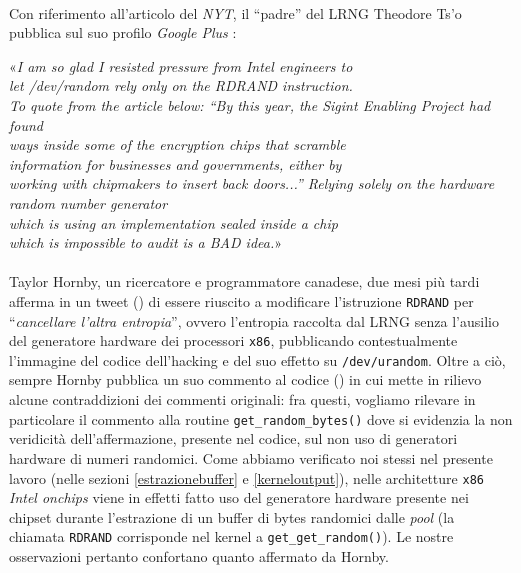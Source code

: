 \documentclass{article}
\begin{document}
 \paragraph{}Con riferimento all'articolo del \emph{NYT}, il ``padre'' del LRNG
 Theodore Ts'o pubblica sul suo profilo \emph{Google Plus} \cite{tso2}:
 \begin{center}
 «\emph{I am so glad I resisted pressure from Intel engineers to \\ 
 let /dev/random rely only on the RDRAND instruction.\\   
 To quote from the article below:\newline\newline
``By this year, the Sigint Enabling Project had found\\ 
ways inside some of the encryption chips that scramble\\
information for businesses and governments, either by \\
working with chipmakers to insert back doors...''\newline\newline
Relying solely on the hardware random number generator \\
which is using an implementation sealed inside a chip\\ 
which is impossible to audit is a BAD idea.﻿}»
 \end{center}
 \paragraph{}Taylor Hornby, un ricercatore e programmatore canadese, due mesi
 più tardi afferma in un tweet (\cite{tayl}) di essere riuscito a modificare
 l'istruzione \verb+RDRAND+ per ``\emph{cancellare l'altra entropia}'', ovvero
 l'entropia raccolta dal LRNG senza l'ausilio del generatore hardware dei
 processori \verb+x86+, pubblicando contestualmente l'immagine del codice
 dell'hacking e del suo effetto su \verb+/dev/urandom+. Oltre a ciò, sempre
 Hornby pubblica un suo commento al codice (\cite{tayl2}) in cui mette in
 rilievo alcune contraddizioni dei commenti originali: fra questi, vogliamo rilevare in
 particolare il commento alla routine \verb+get_random_bytes()+ dove
 si evidenzia la non veridicità dell'affermazione, presente nel codice, sul non
 uso di generatori hardware di numeri randomici. Come abbiamo verificato noi
 stessi nel presente lavoro (nelle sezioni \ref{estrazionebuffer} e 
 \ref{kerneloutput}), nelle architetture \verb+x86+ \emph{Intel onchips} viene
 in effetti fatto uso del generatore hardware presente nei chipset durante
 l'estrazione di un buffer di bytes randomici dalle \emph{pool} (la
 chiamata \verb+RDRAND+ corrisponde nel kernel a \verb+get_get_random()+).
 Le nostre osservazioni pertanto confortano quanto affermato da Hornby.
\end{document}
